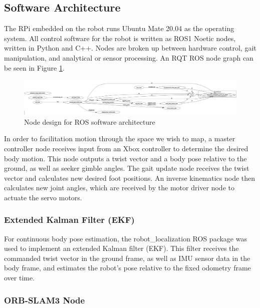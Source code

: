 \documentclass[twocolumn]{article}
\begin{document}
\subsection{ Software Architecture }

The RPi embedded on the robot runs Ubuntu Mate 20.04 as the operating system. All control software for the robot is written as ROS1 Noetic nodes, written in Python and C++. Nodes are broken up between hardware control, gait manipulation, and analytical or sensor processing. An RQT ROS node graph can be seen in Figure \ref{fig:rqt}.


\begin{figure}[h]
    \centering
    \includegraphics[scale=0.12]{figures/rosgraph.png}
    \caption{ Node design for ROS software architecture }
    \label{fig:rqt}
\end{figure}

In order to facilitation motion through the space we wish to map, a master controller node receives input from an Xbox controller to determine the desired body motion. This node outputs a twist vector and a body pose relative to the ground, as well as seeker gimble angles. The gait update node receives the twist vector and calculates new desired foot positions. An inverse kinematics node then calculates new joint angles, which are received by the motor driver node to actuate the servo motors.

\subsubsection{ Extended Kalman Filter (EKF)}

For continuous body pose estimation, the robot\_localization ROS package \cite{robotlocalization} was used to implement an extended Kalman filter (EKF). This filter receives the commanded twist vector in the ground frame, as well as IMU sensor data in the body frame, and estimates the robot's pose relative to the fixed odometry frame over time.

\subsubsection{ ORB-SLAM3 Node}
\end{document}
